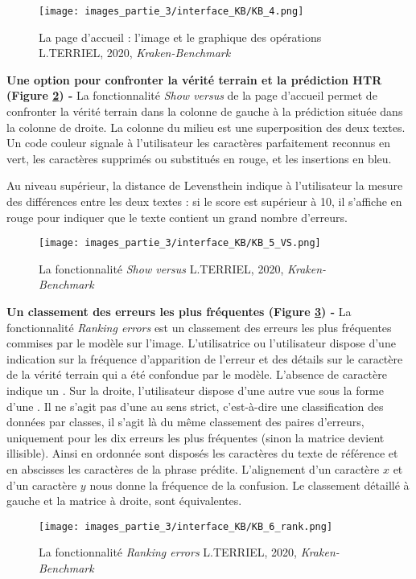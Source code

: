 \begin{figure}[H]
    \centering
    \texttt{[image: images\_partie\_3/interface\_KB/KB\_4.png]}
        \caption{La page d'accueil : l'image et le graphique des opérations \textcopyright L.TERRIEL, 2020, \textit{Kraken-Benchmark}}
        \label{fig:accueil_KB_2}
\end{figure}
\newpage
\textbf{Une option pour confronter la vérité terrain et la prédiction HTR (Figure \ref{fig:accueil_KB_3}) - } La fonctionnalité \textit{Show versus} de la page d'accueil permet de confronter la vérité terrain dans la colonne de gauche à la prédiction située dans la colonne de droite. La colonne du milieu est une superposition des deux textes. Un code couleur signale à l'utilisateur les caractères parfaitement reconnus en vert, les caractères supprimés ou substitués en rouge, et les insertions en bleu. 

Au niveau supérieur, la distance de Levensthein indique à l'utilisateur la mesure des différences entre les deux textes : si le score est supérieur à 10, il s'affiche en rouge pour indiquer que le texte contient un grand nombre d'erreurs.
\begin{figure}[H]
    \centering
    \texttt{[image: images\_partie\_3/interface\_KB/KB\_5\_VS.png]}
        \caption{La fonctionnalité \textit{Show versus} \textcopyright L.TERRIEL, 2020, \textit{Kraken-Benchmark}}
        \label{fig:accueil_KB_3}
\end{figure}
\bigskip

\textbf{Un classement des erreurs les plus fréquentes (Figure \ref{fig:accueil_KB_4}) - }  La fonctionnalité \textit{Ranking errors} est un classement des erreurs les plus fréquentes commises par le modèle sur l'image. L'utilisatrice ou l'utilisateur dispose d'une indication sur la fréquence d'apparition de l'erreur et des détails sur le caractère de la vérité terrain qui a été confondue par le modèle. L'absence de caractère indique un . Sur la droite, l'utilisateur dispose d'une autre vue sous la forme d'une . Il ne s'agit pas d'une  au sens strict, c'est-à-dire une classification des données par classes, il s'agit là du même classement des paires d'erreurs, uniquement pour les dix erreurs les plus fréquentes (sinon la matrice devient illisible). \newpage Ainsi en ordonnée sont disposés les caractères du texte de référence et en abscisses les caractères de la phrase prédite. L'alignement d'un caractère $x$ et d'un caractère $y$ nous donne la fréquence de la confusion. Le classement détaillé à gauche et la matrice à droite, sont équivalentes. 
\begin{figure}[H]
    \centering
    \texttt{[image: images\_partie\_3/interface\_KB/KB\_6\_rank.png]}
        \caption{La fonctionnalité \textit{Ranking errors} \textcopyright L.TERRIEL, 2020, \textit{Kraken-Benchmark}}
        \label{fig:accueil_KB_4}
\end{figure}
\bigskip

